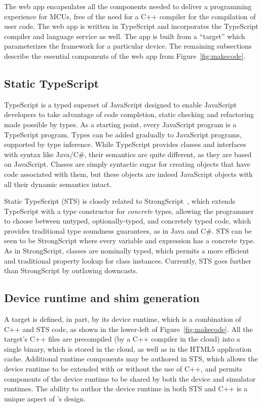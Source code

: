 The web app encapsulates all the components needed to deliver a programming experience for MCUs, free of the need for a C++ compiler for the compilation of user code. The web app is written in TypeScript and incorporates the TypeScript compiler and language service as well. The app is built from a \MC ``target'' which parameterizes the \MC framework for a particular device. The remaining subsections describe the essential components of the web app from Figure~\ref{fig:makecode}.

\subsection{Static TypeScript}

TypeScript is a typed superset of JavaScript designed to enable JavaScript developers to take advantage of code
completion, static checking and refactoring made possible by types.
As a starting point, every JavaScript program is a TypeScript program.  Types can be added gradually to
JavaScript programs, supported by type inference.
While TypeScript provides classes and interfaces with syntax like
Java/C\#, their semantics are quite different, as they are based on JavaScript. Classes are simply syntactic sugar for creating objects that have code associated with them, but these objects are indeed
JavaScript objects with all their dynamic semantics intact.

Static TypeScript (STS) is closely related to Strong\-Script~\cite{StrongScriptECOOP15}, which extends TypeScript with a type constructor for \emph{concrete} types, allowing the programmer to choose between untyped, optionally-typed, and concretely typed code, which provides traditional type soundness guarantees, as in Java and C\#. STS can be seen to be StrongScript where every variable and expression has a concrete type. As in StrongScript, classes are nominally typed, which permits a more efficient and traditional property lookup for class instances. Currently, STS goes further than StrongScript by outlawing downcasts.

\subsection{Device runtime and shim generation}
\label{sec:shim-gen}

A \MC target is defined, in part, by its device runtime, which is a combination of C++ and STS code, as shown in the lower-left of Figure~\ref{fig:makecode}. All the target's C++ files are precompiled (by a C++ compiler in the cloud) into a single binary, which is stored in the cloud, as well as in the HTML5 application cache. Additional runtime components may be authored in STS, which allows the device runtime to be extended with or without the use of C++, and permits components of the device runtime to be shared by both the device and simulator runtimes. The ability to author the device runtime in both STS and C++ is a unique aspect of \MCN's design.


